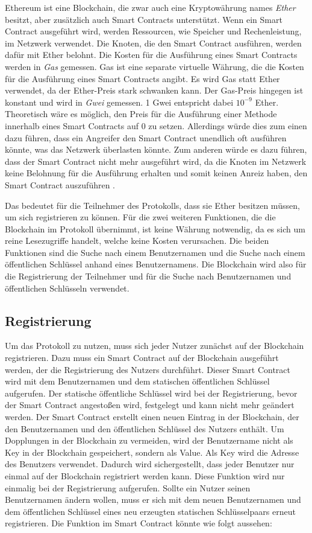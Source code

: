 Ethereum ist eine Blockchain, die zwar auch eine Kryptowährung names \textit{Ether} besitzt, aber zusätzlich auch Smart Contracts unterstützt. Wenn ein Smart Contract ausgeführt wird, werden Ressourcen, wie Speicher und Rechenleistung, im Netzwerk verwendet. Die Knoten, die den Smart Contract ausführen, werden dafür mit Ether belohnt. Die Kosten für die Ausführung eines Smart Contracts werden in \textit{Gas} gemessen. Gas ist eine separate virtuelle Währung, die die Kosten für die Ausführung eines Smart Contracts angibt. Es wird Gas statt Ether verwendet, da der Ether-Preis stark schwanken kann. Der Gas-Preis hingegen ist konstant und wird in \textit{Gwei} gemessen. 1 Gwei entspricht dabei $10^{-9}$ Ether. Theoretisch wäre es möglich, den Preis für die Ausführung einer Methode innerhalb eines Smart Contracts auf $0$ zu setzen. Allerdings würde dies zum einen dazu führen, dass ein Angreifer den Smart Contract unendlich oft ausführen könnte, was das Netzwerk überlasten könnte. Zum anderen würde es dazu führen, dass der Smart Contract nicht mehr ausgeführt wird, da die Knoten im Netzwerk keine Belohnung für die Ausführung erhalten und somit keinen Anreiz haben, den Smart Contract auszuführen \parencite[S. 105-107]{Antonopoulos_MasteringEthereum}. 

Das bedeutet für die Teilnehmer des Protokolls, dass sie Ether besitzen müssen, um sich registrieren zu können. Für die zwei weiteren Funktionen, die die Blockchain im Protokoll übernimmt, ist keine Währung notwendig, da es sich um reine Lesezugriffe handelt, welche keine Kosten verursachen. Die beiden Funktionen sind die Suche nach einem Benutzernamen und die Suche nach einem öffentlichen Schlüssel anhand eines Benutzernamens. Die Blockchain wird also für die Registrierung der Teilnehmer und für die Suche nach Benutzernamen und öffentlichen Schlüsseln verwendet.


\subsection{Registrierung}
\label{subsec:contract_registrierung}
Um das Protokoll zu nutzen, muss sich jeder Nutzer zunächst auf der Blockchain registrieren. Dazu muss ein Smart Contract auf der Blockchain ausgeführt werden, der die Registrierung des Nutzers durchführt. Dieser Smart Contract wird mit dem Benutzernamen und dem statischen öffentlichen Schlüssel aufgerufen. Der statische öffentliche Schlüssel wird bei der Registrierung, bevor der Smart Contract angestoßen wird, festgelegt und kann nicht mehr geändert werden. Der Smart Contract erstellt einen neuen Eintrag in der Blockchain, der den Benutzernamen und den öffentlichen Schlüssel des Nutzers enthält. Um Dopplungen in der Blockchain zu vermeiden, wird der Benutzername nicht als Key in der Blockchain gespeichert, sondern als Value. Als Key wird die Adresse des Benutzers verwendet. Dadurch wird sichergestellt, dass jeder Benutzer nur einmal auf der Blockchain registriert werden kann. Diese Funktion wird nur einmalig bei der Registrierung aufgerufen. Sollte ein Nutzer seinen Benutzernamen ändern wollen, muss er sich mit dem neuen Benutzernamen und dem öffentlichen Schlüssel eines neu erzeugten statischen Schlüsselpaars erneut registrieren. Die Funktion im Smart Contract könnte wie folgt aussehen:

